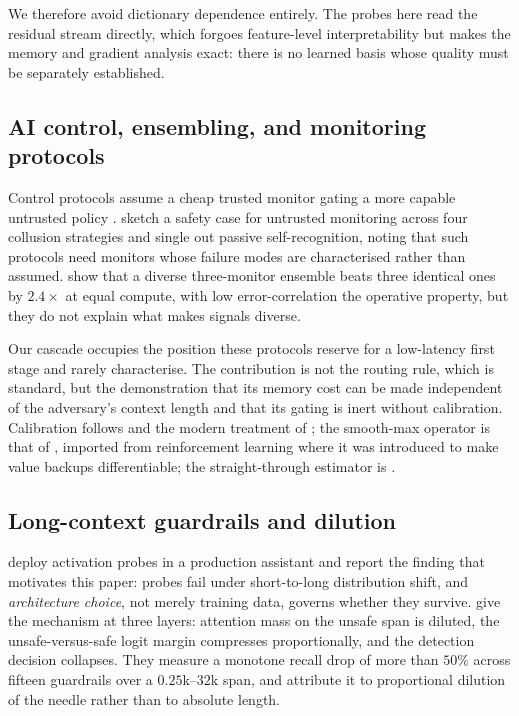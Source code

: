\documentclass[10pt]{article}
\theoremstyle{plain}
\theoremstyle{definition}
\theoremstyle{remark}
\begin{document}
We therefore avoid dictionary dependence entirely. The probes here read the residual stream
directly, which forgoes feature-level interpretability but makes the memory and gradient
analysis exact: there is no learned basis whose quality must be separately established.

\subsection{AI control, ensembling, and monitoring protocols}
Control protocols assume a cheap trusted monitor gating a more capable untrusted policy
\citep{greenblatt2023control}. \citet{gardnerchallis2026untrusted} sketch a safety case for
untrusted monitoring across four collusion strategies and single out passive
self-recognition, noting that such protocols need monitors whose failure modes are
characterised rather than assumed. \citet{koran2026ensemble} show that a diverse
three-monitor ensemble beats three identical ones by $2.4\times$ at equal compute, with low
error-correlation the operative property, but they do not explain what makes signals
diverse.

Our cascade occupies the position these protocols reserve for a low-latency first stage and
rarely characterise. The contribution is not the routing rule, which is standard, but the
demonstration that its memory cost can be made independent of the adversary's context length
and that its gating is inert without calibration. Calibration follows
\citet{platt1999probabilistic} and the modern treatment of \citet{guo2017calibration}; the
smooth-max operator is that of \citet{asadi2017boltzmann}, imported from reinforcement
learning where it was introduced to make value backups differentiable; the
straight-through estimator is \citet{bengio2013estimating}.

\subsection{Long-context guardrails and dilution}
\citet{kramar2026gemini} deploy activation probes in a production assistant and report the
finding that motivates this paper: probes fail under short-to-long distribution shift, and
\emph{architecture choice}, not merely training data, governs whether they survive.
\citet{chen2026longguard} give the mechanism at three layers: attention mass on the
unsafe span is diluted, the unsafe-versus-safe logit margin compresses proportionally, and
the detection decision collapses. They measure a monotone recall drop of more than $50\%$
across fifteen guardrails over a $0.25$k--$32$k span, and attribute it to proportional
dilution of the needle rather than to absolute length.
\end{document}
